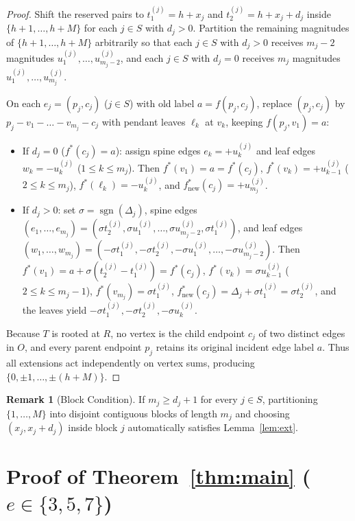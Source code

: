 \documentclass[11pt]{article}
\theoremstyle{definition}
\newtheorem{remark}[theorem]{Remark}
\begin{document}
\begin{proof}
Shift the reserved pairs to $t_1^{(j)} = h + x_j$ and $t_2^{(j)} = h + x_j + d_j$ inside $\{h+1, \dots, h+M\}$ for each $j \in S$ with $d_j > 0$. Partition the remaining magnitudes of $\{h+1, \dots, h+M\}$ arbitrarily so that each $j \in S$ with $d_j > 0$ receives $m_j - 2$ magnitudes $u_1^{(j)}, \dots, u_{m_j - 2}^{(j)}$, and each $j \in S$ with $d_j = 0$ receives $m_j$ magnitudes $u_1^{(j)}, \dots, u_{m_j}^{(j)}$.

On each $e_j = (p_j, c_j)$ ($j \in S$) with old label $a = f(p_j, c_j)$, replace $(p_j, c_j)$ by $p_j - v_1 - \dots - v_{m_j} - c_j$ with pendant leaves $\ell_k$ at $v_k$, keeping $f(p_j, v_1) = a$:
\begin{itemize}
\item If $d_j = 0$ ($f^*(c_j) = a$): assign spine edges $e_k = +u_k^{(j)}$ and leaf edges $w_k = -u_k^{(j)}$ ($1 \le k \le m_j$). Then $f^*(v_1) = a = f^*(c_j)$, $f^*(v_k) = +u_{k-1}^{(j)}$ ($2 \le k \le m_j$), $f^*(\ell_k) = -u_k^{(j)}$, and $f^*_{\text{new}}(c_j) = +u_{m_j}^{(j)}$.
\item If $d_j > 0$: set $\sigma = \operatorname{sgn}(\Delta_j)$, spine edges $(e_1, \dots, e_{m_j}) = (\sigma t_2^{(j)}, \sigma u_1^{(j)}, \dots, \sigma u_{m_j - 2}^{(j)}, \sigma t_1^{(j)})$, and leaf edges $(w_1, \dots, w_{m_j}) = (-\sigma t_1^{(j)}, -\sigma t_2^{(j)}, -\sigma u_1^{(j)}, \dots, -\sigma u_{m_j - 2}^{(j)})$. Then $f^*(v_1) = a + \sigma(t_2^{(j)} - t_1^{(j)}) = f^*(c_j)$, $f^*(v_k) = \sigma u_{k-1}^{(j)}$ ($2 \le k \le m_j - 1$), $f^*(v_{m_j}) = \sigma t_1^{(j)}$, $f^*_{\text{new}}(c_j) = \Delta_j + \sigma t_1^{(j)} = \sigma t_2^{(j)}$, and the leaves yield $-\sigma t_1^{(j)}, -\sigma t_2^{(j)}, -\sigma u_k^{(j)}$.
\end{itemize}
Because $T$ is rooted at $R$, no vertex is the child endpoint $c_j$ of two distinct edges in $O$, and every parent endpoint $p_j$ retains its original incident edge label $a$. Thus all extensions act independently on vertex sums, producing $\{0, \pm 1, \dots, \pm(h+M)\}$.
\end{proof}

\begin{remark}[Block Condition]\label{rem:block}
If $m_j \ge d_j + 1$ for every $j \in S$, partitioning $\{1, \dots, M\}$ into disjoint contiguous blocks of length $m_j$ and choosing $(x_j, x_j + d_j)$ inside block $j$ automatically satisfies Lemma~\ref{lem:ext}.
\end{remark}

\section{Proof of Theorem~\ref{thm:main} ($e \in \{3, 5, 7\}$)}
\end{document}
